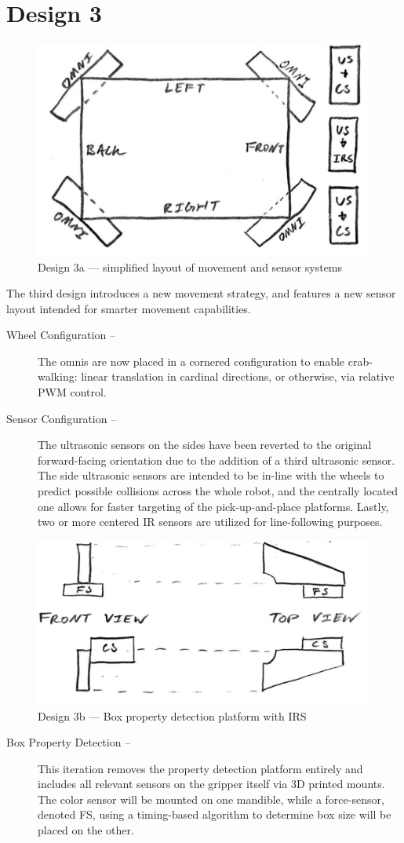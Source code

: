 \documentclass[11pt]{report}
\begin{document}
\section{Design 3}\label{sec:design3}
\begin{figure}[H]
    \centering
    \includegraphics[width=0.5\linewidth]{Images//Designs/Design3a.pdf}
    \caption{Design 3a --- simplified layout of movement and sensor systems}
    \label{fig:design3a}
\end{figure}
The third design introduces a new movement strategy, and features a new sensor layout intended for smarter movement capabilities.
\begin{description}
    \item[Wheel Configuration --]The \glspl{omni} are now placed in a cornered configuration to enable crab-walking: linear translation in cardinal directions, or otherwise, via relative \gls{PWM} control.
    \item[Sensor Configuration --]The ultrasonic sensors on the sides have been reverted to the original forward-facing orientation due to the addition of a third ultrasonic sensor. The side ultrasonic sensors are intended to be in-line with the wheels to predict possible collisions across the whole robot, and the centrally located one allows for faster targeting of the pick-up-and-place platforms. Lastly, two or more centered \gls{IR} sensors are utilized for line-following purposes.
\end{description}
\begin{figure}[H]
    \centering
    \includegraphics[width=0.5\linewidth]{Images//Designs/Design3b.pdf}
    \caption{Design 3b --- Box property detection platform with IRS}
    \label{fig:design3b}
\end{figure}
\begin{description}
    \item[Box Property Detection --]This iteration removes the property detection platform entirely and includes all relevant sensors on the gripper itself via 3D printed mounts. The color sensor will be mounted on one mandible, while a force-sensor, denoted \gls{FS}, using a timing-based algorithm to determine box size will be placed on the other.
\end{description}
\end{document}
